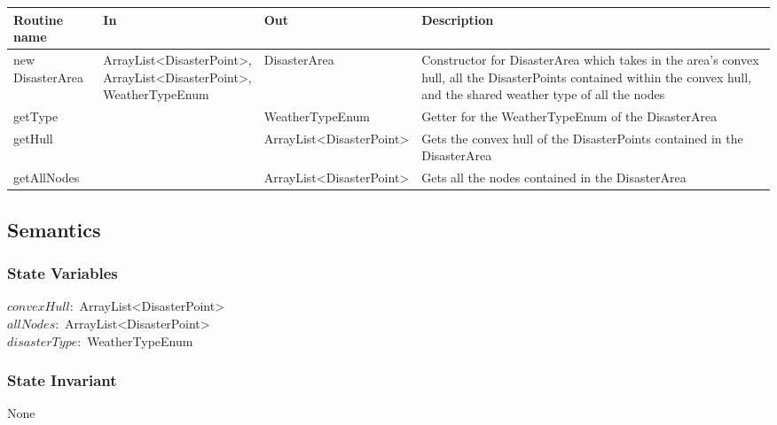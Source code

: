\documentclass[12pt]{article}
\begin{document}
                \begin{tabular}{| l | l | l | p{5cm} |}
                \hline
                \textbf{Routine name} & \textbf{In} & \textbf{Out} & \textbf{Description}\\
                \hline
                new DisasterArea & \makecell{ArrayList<DisasterPoint>, \\ ArrayList<DisasterPoint>, \\ WeatherTypeEnum} & DisasterArea & Constructor for DisasterArea which takes in the area's convex hull, all the DisasterPoints contained within the convex hull, and the shared weather type of all the nodes\\
                \hline 
                getType&~&WeatherTypeEnum&Getter for the WeatherTypeEnum of the DisasterArea\\
                \hline
                getHull&~&ArrayList<DisasterPoint>&Gets the convex hull of the DisasterPoints contained in the DisasterArea\\
                \hline
                getAllNodes&~&ArrayList<DisasterPoint>&Gets all the nodes contained in the DisasterArea\\
                \hline
                \end{tabular}
                
                \subsection* {Semantics}
                    \subsubsection *{State Variables} 
                        $convexHull:$ ArrayList<DisasterPoint>\\
                        $allNodes:$ ArrayList<DisasterPoint>\\
                        $disasterType:$ WeatherTypeEnum \\
                       
                    \subsubsection *{State Invariant}
                    
                    None
                    
\end{document}
